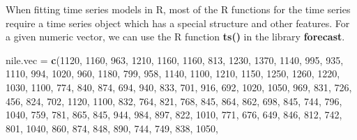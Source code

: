 \documentclass[
]{book}
\newenvironment{Shaded}{\begin{snugshade}}{\end{snugshade}}
\newcommand{\DecValTok}[1]{\textcolor[rgb]{0.00,0.00,0.81}{#1}}
\newcommand{\FunctionTok}[1]{\textcolor[rgb]{0.13,0.29,0.53}{\textbf{#1}}}
\newcommand{\NormalTok}[1]{#1}
\newcommand{\OtherTok}[1]{\textcolor[rgb]{0.56,0.35,0.01}{#1}}
\begin{document}
When fitting time series models in R, most of the R functions for the time series require a time series object which has a special structure and other features. For a given numeric vector, we can use the R function \textbf{ts()} in the library \textbf{forecast}.

\begin{Shaded}
\begin{Highlighting}[]
\NormalTok{nile.vec }\OtherTok{=} \FunctionTok{c}\NormalTok{(}\DecValTok{1120}\NormalTok{, }\DecValTok{1160}\NormalTok{, }\DecValTok{963}\NormalTok{, }\DecValTok{1210}\NormalTok{, }\DecValTok{1160}\NormalTok{, }\DecValTok{1160}\NormalTok{, }\DecValTok{813}\NormalTok{, }\DecValTok{1230}\NormalTok{, }\DecValTok{1370}\NormalTok{, }\DecValTok{1140}\NormalTok{, }\DecValTok{995}\NormalTok{, }\DecValTok{935}\NormalTok{, }\DecValTok{1110}\NormalTok{, }\DecValTok{994}\NormalTok{,}
\DecValTok{1020}\NormalTok{, }\DecValTok{960}\NormalTok{, }\DecValTok{1180}\NormalTok{, }\DecValTok{799}\NormalTok{, }\DecValTok{958}\NormalTok{, }\DecValTok{1140}\NormalTok{, }\DecValTok{1100}\NormalTok{, }\DecValTok{1210}\NormalTok{, }\DecValTok{1150}\NormalTok{, }\DecValTok{1250}\NormalTok{, }\DecValTok{1260}\NormalTok{, }\DecValTok{1220}\NormalTok{, }\DecValTok{1030}\NormalTok{, }\DecValTok{1100}\NormalTok{, }\DecValTok{774}\NormalTok{, }\DecValTok{840}\NormalTok{,}
\DecValTok{874}\NormalTok{, }\DecValTok{694}\NormalTok{, }\DecValTok{940}\NormalTok{, }\DecValTok{833}\NormalTok{, }\DecValTok{701}\NormalTok{, }\DecValTok{916}\NormalTok{, }\DecValTok{692}\NormalTok{, }\DecValTok{1020}\NormalTok{, }\DecValTok{1050}\NormalTok{, }\DecValTok{969}\NormalTok{, }\DecValTok{831}\NormalTok{, }\DecValTok{726}\NormalTok{, }\DecValTok{456}\NormalTok{, }\DecValTok{824}\NormalTok{, }\DecValTok{702}\NormalTok{, }\DecValTok{1120}\NormalTok{, }\DecValTok{1100}\NormalTok{, }\DecValTok{832}\NormalTok{,}
\DecValTok{764}\NormalTok{, }\DecValTok{821}\NormalTok{, }\DecValTok{768}\NormalTok{, }\DecValTok{845}\NormalTok{, }\DecValTok{864}\NormalTok{, }\DecValTok{862}\NormalTok{, }\DecValTok{698}\NormalTok{, }\DecValTok{845}\NormalTok{, }\DecValTok{744}\NormalTok{, }\DecValTok{796}\NormalTok{, }\DecValTok{1040}\NormalTok{, }\DecValTok{759}\NormalTok{, }\DecValTok{781}\NormalTok{, }\DecValTok{865}\NormalTok{, }\DecValTok{845}\NormalTok{, }\DecValTok{944}\NormalTok{, }\DecValTok{984}\NormalTok{, }\DecValTok{897}\NormalTok{,}
\DecValTok{822}\NormalTok{, }\DecValTok{1010}\NormalTok{, }\DecValTok{771}\NormalTok{, }\DecValTok{676}\NormalTok{, }\DecValTok{649}\NormalTok{, }\DecValTok{846}\NormalTok{, }\DecValTok{812}\NormalTok{, }\DecValTok{742}\NormalTok{, }\DecValTok{801}\NormalTok{, }\DecValTok{1040}\NormalTok{, }\DecValTok{860}\NormalTok{, }\DecValTok{874}\NormalTok{, }\DecValTok{848}\NormalTok{, }\DecValTok{890}\NormalTok{, }\DecValTok{744}\NormalTok{, }\DecValTok{749}\NormalTok{, }\DecValTok{838}\NormalTok{, }\DecValTok{1050}\NormalTok{,}

\end{Highlighting}
\end{Shaded}
\end{document}
